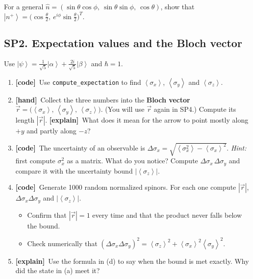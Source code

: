 \documentclass[11pt]{article}
\newif\ifsolutions
\newcommand{\tagbox}[2]{\textcolor{#1}{\textsf{\textbf{[#2]}}}}
\newcommand{\hand}{\tagbox{handc}{hand}}
\newcommand{\code}{\tagbox{codec}{code}}
\newcommand{\expl}{\tagbox{explc}{explain}}
\newcommand{\ans}[1]{\ifsolutions\par\noindent\hspace*{1.5em}\textcolor{ansc}{\small\textit{Answer:} #1}\fi}
\newcommand{\ket}[1]{\left|#1\right\rangle}
\newcommand{\expval}[1]{\left\langle#1\right\rangle}
\newcommand{\one}{\mathbb{1}}
\newcommand{\py}[1]{\texttt{#1}}
\begin{document}
\begin{gradext}
For a general $\hat n = (\sin\theta\cos\phi,\ \sin\theta\sin\phi,\ \cos\theta)$, show that
$\ket{n^+} = \big(\cos\tfrac{\theta}{2},\ e^{i\phi}\sin\tfrac{\theta}{2}\big)^T$.
\end{gradext}

\subsection*{SP2. Expectation values and the Bloch vector}

Use $\ket{\psi} = \tfrac{1}{\sqrt5}\ket{\alpha} + \tfrac{2i}{\sqrt5}\ket{\beta}$ and $\hbar = 1$.

\begin{enumerate}
\item \code\ Use \py{compute\_expectation} to find $\expval{\sigma_x}$, $\expval{\sigma_y}$ and $\expval{\sigma_z}$.
\ans{$0$, $\ 4/5$, $\ -3/5$.}

\item \hand\ Collect the three numbers into the \textbf{Bloch vector}
$\vec r = \big(\expval{\sigma_x},\, \expval{\sigma_y},\, \expval{\sigma_z}\big)$. (You will use $\vec r$ again in SP4.)
Compute its length $|\vec r|$.
\expl\ What does it mean for the arrow to point mostly along $+y$ and partly along $-z$?
\ans{$|\vec r| = 1$. The state is a spin pointing mostly along $+y$, tipped below the equator; it is more likely to be found $\beta$ than $\alpha$ ($4/5$ vs.\ $1/5$).}

\item \code\ The uncertainty of an observable is $\Delta\sigma_x = \sqrt{\expval{\sigma_x^2} - \expval{\sigma_x}^2}$.
\emph{Hint:} first compute $\sigma_x^2$ as a matrix. What do you notice?
Compute $\Delta\sigma_x\,\Delta\sigma_y$ and compare it with the uncertainty bound $|\expval{\sigma_z}|$.
\ans{$\sigma_x^2 = \one$. $\Delta\sigma_x\Delta\sigma_y = 1\cdot\tfrac35 = \tfrac35 = |\expval{\sigma_z}|$: the bound is met exactly.}

\item \code\ Generate 1000 random normalized spinors. For each one compute $|\vec r|$, $\Delta\sigma_x\Delta\sigma_y$ and $|\expval{\sigma_z}|$.
\begin{itemize}
\item Confirm that $|\vec r| = 1$ every time and that the product never falls below the bound.
\item Check numerically that $(\Delta\sigma_x\Delta\sigma_y)^2 = \expval{\sigma_z}^2 + \expval{\sigma_x}^2\expval{\sigma_y}^2$.
\end{itemize}

\item \expl\ Use the formula in (d) to say when the bound is met exactly. Why did the state in (a) meet it?
\ans{Exactly when $\expval{\sigma_x}\expval{\sigma_y} = 0$; in (a), $\expval{\sigma_x} = 0$.}
\end{enumerate}
\end{document}
